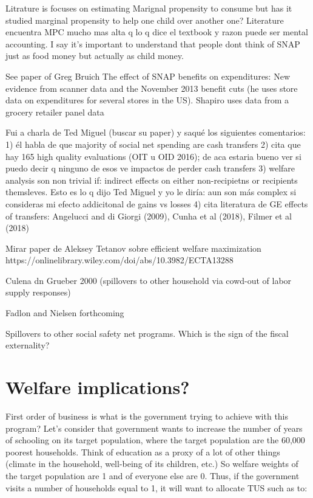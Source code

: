 \documentclass[12pt]{article}
\begin{document}
Litrature is focuses on estimating Marignal propensity to consume but has it studied marginal propensity to help one child over another one? Literature encuentra MPC mucho mas alta q lo q dice el textbook y razon puede ser mental accounting. I say it's important to understand that people dont think of SNAP just as food money but actually as child money.

See paper of Greg Bruich The effect of SNAP benefits on expenditures: New evidence from scanner data and the November 2013 benefit cuts (he uses store data on expenditures for several stores in the US). Shapiro uses data from a grocery retailer panel data

Fui a charla de Ted Miguel (buscar su paper) y saqué los siguientes comentarios:
1) él habla de que majority of social net spending are cash transfers
2) cita que hay 165 high quality evaluations (OIT u OID 2016); de aca estaria bueno ver si puedo decir q ninguno de esos ve impactos de perder cash transfers
3) welfare analysis son non trivial if: indirect effects on either non-recipietns or recipients themsleves. Esto es lo q dijo Ted Miguel y yo le diría: aun son más complex si consideras mi efecto addicitonal de gains vs losses
4) cita literatura de GE effects of transfers: Angelucci and di Giorgi (2009), Cunha et al (2018), Filmer et al (2018)

Mirar paper de Aleksey Tetanov sobre efficient welfare maximization https://onlinelibrary.wiley.com/doi/abs/10.3982/ECTA13288

Culena dn Grueber 2000 (spillovers to other household via cowd-out of labor supply responses)

Fadlon and Nielsen forthcoming

Spillovers to other social safety net programs. Which is the sign of the fiscal externality?

\section{Welfare implications?}
First order of business is what is the government trying to achieve with this program? Let's consider that government wants to increase the number of years of schooling on its target population, where the target population are the 60,000 poorest households. Think of education as a proxy of a lot of other things (climate in the household, well-being of its children, etc.) So welfare weights of the target population are 1 and of everyone else are 0. Thus, if the government visits a number of households equal to 1, it will want to allocate TUS such as to:
\end{document}
